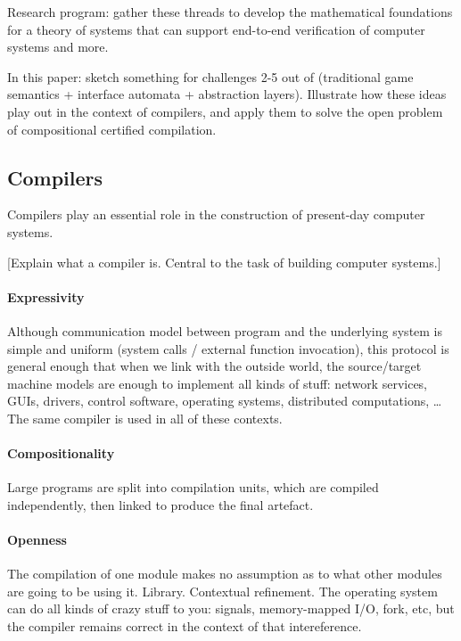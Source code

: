 \documentclass[sigplan,10pt,review,anonymous]{acmart}
\begin{document}
Research program:
gather these threads to develop the mathematical foundations
for a theory of systems
that can support end-to-end verification of computer systems
and more.

In this paper:
sketch something for challenges 2-5
out of (traditional game semantics + interface automata + abstraction layers).
Illustrate how these ideas play out in the context of compilers,
and apply them to solve the open problem of
compositional certified compilation.

\subsection{Compilers} %

Compilers play an essential role in the construction
of present-day computer systems.




[Explain what a compiler is.
Central to the task of building computer systems.]

\paragraph{Expressivity}
Although communication model between program
and the underlying system is simple and uniform
(system calls / external function invocation),
this protocol is general enough that
when we link with the outside world,
the source/target machine models are enough to
implement all kinds of stuff:
network services, GUIs, drivers, control software,
operating systems, distributed computations, \ldots
The same compiler is used in all of these contexts.

\paragraph{Compositionality}
Large programs are split into compilation units,
which are compiled independently,
then linked to produce the final artefact.

\paragraph{Openness}
The compilation of one module
makes no assumption as to what other modules are going to be using it.
Library. Contextual refinement.
The operating system can do all kinds of crazy stuff to you:
signals, memory-mapped I/O, fork, etc,
but the compiler remains correct in the context of that intereference.
\end{document}
